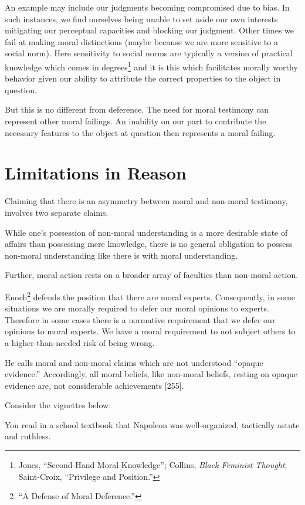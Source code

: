 \documentclass[phdthesis,12pt,final,a4paper]{wuthesis}
\theoremstyle{definition}
\theoremstyle{definition}
\theoremstyle{definition}
\theoremstyle{definition}
\theoremstyle{remark}
\begin{document}
An example may include our judgments becoming compromised due to bias. In such instances, we find ourselves being unable to set aside our own interests mitigating our perceptual capacities and blocking our judgment. Other times we fail at making moral distinctions (maybe because we are more sensitive to a social norm). Here sensitivity to social norms are typically a version of practical knowledge which comes in degrees\footnote{Jones, {``Second-{Hand Moral Knowledge}''}; Collins, \emph{Black Feminist Thought}; Saint-Croix, {``Privilege and {Position}.''}} and it is this which facilitates morally worthy behavior given our ability to attribute the correct properties to the object in question.

But this is no different from deference. The need for moral testimony can represent other moral failings. An inability on our part to contribute the necessary features to the object at question then represents a moral failing.

\section{Limitations in Reason}\label{limitations-in-reason}

Claiming that there is an asymmetry between moral and non-moral testimony, involves two separate claims.

While one's possession of non-moral understanding is a more desirable state of affairs than possessing mere knowledge, there is no general obligation to possess non-moral understanding like there is with moral understanding.

Further, moral action rests on a broader array of faculties than non-moral action.

Enoch\footnote{{``A {Defense} of {Moral Deference}.''}} defends the position that there are moral experts. Consequently, in some situations we are morally required to defer our moral opinions to experts. Therefore in some cases there is a normative requirement that we defer our opinions to moral experts. We have a moral requirement to not subject others to a higher-than-needed risk of being wrong.

He calls moral and non-moral claims which are not understood ``opaque evidence.'' Accordingly, all moral beliefs, like non-moral beliefs, resting on opaque evidence are, not considerable achievements {[}255{]}.

Consider the vignettes below:

You read in a school textbook that Napoleon was well-organized, tactically astute and ruthless.
\end{document}
